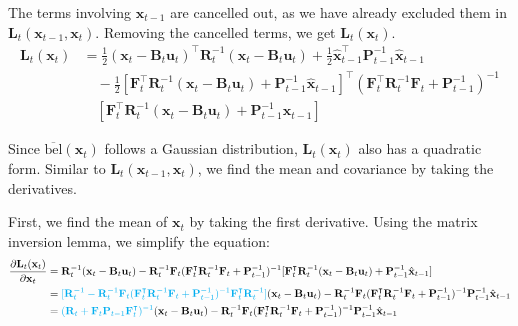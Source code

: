 \documentclass[10pt]{article}
\begin{document}
The terms involving $\mathbf{x}_{t-1}$ are cancelled out, as we have already excluded them in $\mathbf{L}_t(\mathbf{x}_{t-1}, \mathbf{x}_t)$. Removing the cancelled terms, we get $\mathbf{L}_t(\mathbf{x}_t)$.
\begin{equation}
	\boxed{	\begin{aligned}
			\mathbf{L}_t(\mathbf{x}_t) & = \frac{1}{2}(\mathbf{x}_t - \mathbf{B}_t\mathbf{u}_t)^{\intercal}\mathbf{R}_t^{-1}(\mathbf{x}_t - \mathbf{B}_t \mathbf{u}_t) + \frac{1}{2}\hat{\mathbf{x}}_{t-1}^{\intercal} \mathbf{P}_{t-1}^{-1} \hat{\mathbf{x}}_{t-1} \\
			& \quad - \frac{1}{2} [ \mathbf{F}_t^{\intercal}\mathbf{R}_t^{-1}(\mathbf{x}_t - \mathbf{B}_t \mathbf{u}_t) + \mathbf{P}_{t-1}^{-1}\hat{\mathbf{x}}_{t-1}]^{\intercal} (\mathbf{F}_t^{\intercal} \mathbf{R}_t^{-1}\mathbf{F}_t + \mathbf{P}_{t-1}^{-1})^{-1} \\
			& \quad [ \mathbf{F}_t^{\intercal}\mathbf{R}_t^{-1}(\mathbf{x}_t - \mathbf{B}_t \mathbf{u}_t) + \mathbf{P}_{t-1}^{-1}\hat{\mathbf{x}}_{t-1}]
	\end{aligned} }
\end{equation}

Since $\overline{\text{bel}}(\mathbf{x}_{t})$ follows a Gaussian distribution, $\mathbf{L}_t(\mathbf{x}_t)$ also has a quadratic form. Similar to $\mathbf{L}_t(\mathbf{x}_{t-1}, \mathbf{x}_t)$, we find the mean and covariance by taking the derivatives.

First, we find the mean of $\mathbf{x}_t$ by taking the first derivative. Using the matrix inversion lemma, we simplify the equation:
\begin{equation}
	\begin{aligned}
		\frac{\partial \mathbf{L}_t(\mathbf{x}_t)}{\partial \mathbf{x}_t} & = \mathbf{R}_t^{-1}(\mathbf{x}_t - \mathbf{B}_t \mathbf{u}_t) - \mathbf{R}_t^{-1}\mathbf{F}_t(\mathbf{F}_t^{\intercal}\mathbf{R}_t^{-1}\mathbf{F}_t + \mathbf{P}_{t-1}^{-1})^{-1} [\mathbf{F}_t^{\intercal}\mathbf{R}_t^{-1}(\mathbf{x}_t - \mathbf{B}_t\mathbf{u}_t) + \mathbf{P}_{t-1}^{-1}\hat{\mathbf{x}}_{t-1}] \\
		& = {\color{Cyan} [\mathbf{R}_t^{-1} - \mathbf{R}_t^{-1}\mathbf{F}_t(\mathbf{F}_t^{\intercal}\mathbf{R}_t^{-1}\mathbf{F}_t + \mathbf{P}_{t-1}^{-1})^{-1} \mathbf{F}_t^{\intercal}\mathbf{R}_t^{-1}] } (\mathbf{x}_t - \mathbf{B}_t\mathbf{u}_t) - \mathbf{R}_t^{-1}\mathbf{F}_t(\mathbf{F}_t^{\intercal}\mathbf{R}_t^{-1}\mathbf{F}_t + \mathbf{P}_{t-1}^{-1})^{-1}\mathbf{P}_{t-1}^{-1}\hat{\mathbf{x}}_{t-1} \\
		& = {\color{Cyan} (\mathbf{R}_t + \mathbf{F}_t\mathbf{P}_{t-1}\mathbf{F}_t^{\intercal})^{-1} } (\mathbf{x}_t - \mathbf{B}_t \mathbf{u}_t) - \mathbf{R}_t^{-1}\mathbf{F}_t(\mathbf{F}_t^{\intercal}\mathbf{R}_t^{-1}\mathbf{F}_t + \mathbf{P}_{t-1}^{-1})^{-1}\mathbf{P}_{t-1}^{-1}\hat{\mathbf{x}}_{t-1}
	\end{aligned}
\end{equation}
\end{document}
